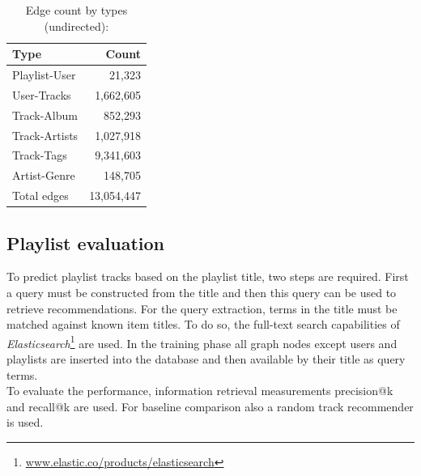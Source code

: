 \documentclass[sigconf]{acmart}
\begin{document}
\begin{table}[H]
	\caption{Edge count by types (undirected):}
	\label{table:edge_count}
	\begin{tabular}{lr}
		\midrule 
		\textbf{Type} & \textbf{Count} \\ 
		\midrule 
		Playlist-User   & 21,323  \\
		User-Tracks     & 1,662,605     \\
		Track-Album		& 852,293 \\
		Track-Artists   & 1,027,918 \\
		Track-Tags   	& 9,341,603 \\
		Artist-Genre	& 148,705  \\
		\midrule 
		Total edges 	& 13,054,447\\
		\bottomrule
	\end{tabular}
\end{table}

\subsection{Playlist evaluation}
\label{subsec:playlist_eval}
To predict playlist tracks based on the playlist title, two steps are required. First a query must be constructed from the title and then this query can be used to retrieve recommendations. For the query extraction, terms in the title must be matched against known item titles. To do so, the full-text search capabilities of \emph{Elasticsearch}\footnote{\url{www.elastic.co/products/elasticsearch}} are used. In the training phase all graph nodes except users and playlists are inserted into the database and then available by their title as query terms.
\\
To evaluate the performance, information retrieval measurements precision@k and recall@k are used. For baseline comparison also a random track recommender is used.

\end{document}
